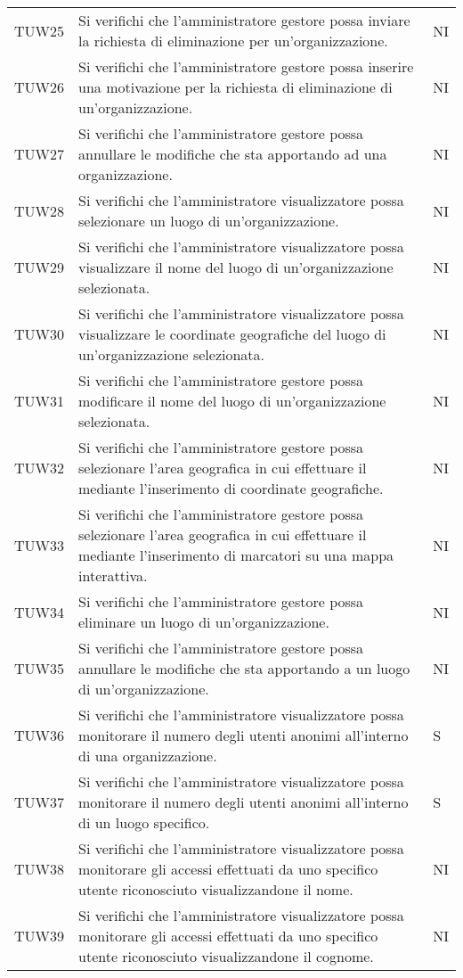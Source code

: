 {\begin{longtable}{ c C{13cm} C{1cm}}
TUW25 & Si verifichi che l'amministratore gestore possa inviare la richiesta di eliminazione per un'organizzazione. & NI \\
TUW26 & Si verifichi che l'amministratore gestore possa inserire una motivazione per la richiesta di eliminazione di un'organizzazione. & NI \\
TUW27 & Si verifichi che l'amministratore gestore possa annullare le modifiche che sta apportando ad una organizzazione. & NI \\
TUW28 & Si verifichi che l’amministratore visualizzatore possa selezionare un luogo di un’organizzazione. & NI \\
TUW29 & Si verifichi che l'amministratore visualizzatore possa visualizzare il nome del luogo di un’organizzazione selezionata. & NI \\
TUW30 & Si verifichi che l'amministratore visualizzatore possa visualizzare le coordinate geografiche del luogo di un’organizzazione selezionata. & NI \\
TUW31 & Si verifichi che l'amministratore gestore possa modificare il nome del luogo di un’organizzazione selezionata. & NI \\
TUW32 & Si verifichi che l'amministratore gestore possa selezionare l'area geografica in cui effettuare il  mediante l'inserimento di coordinate geografiche. & NI \\
TUW33 & Si verifichi che l'amministratore gestore possa selezionare l'area geografica in cui effettuare il  mediante l'inserimento di marcatori su una mappa interattiva. & NI \\
TUW34 & Si verifichi che l'amministratore gestore possa eliminare un luogo di un’organizzazione. & NI \\
TUW35 & Si verifichi che l'amministratore gestore possa annullare le modifiche che sta apportando a un luogo di un’organizzazione.  & NI \\
TUW36 & Si verifichi che l’amministratore visualizzatore possa monitorare il numero degli utenti anonimi all’interno di una organizzazione. & S \\
TUW37 & Si verifichi che l’amministratore visualizzatore possa monitorare il numero degli utenti anonimi all’interno di un luogo specifico. & S \\
TUW38 & Si verifichi che l’amministratore visualizzatore possa monitorare gli accessi effettuati da uno specifico utente riconosciuto visualizzandone il nome. & NI \\
TUW39 & Si verifichi che l’amministratore visualizzatore possa monitorare gli accessi effettuati da uno specifico utente riconosciuto visualizzandone il cognome. & NI \\

\end{longtable}}
